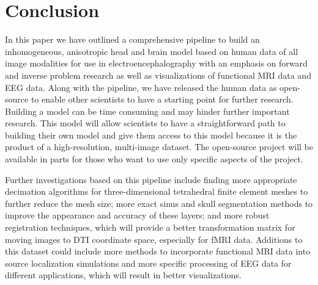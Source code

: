 %
%

\section{Conclusion}
\label{sec:Conclusion}

In this paper we have outlined a comprehensive pipeline to build an inhomogeneous, anisotropic head and brain model based on human data of all image modalities for use in electroencephalography with an emphasis on forward and inverse problem research as well as visualizations of functional MRI data and EEG data. Along with the pipeline, we have released the human data as open-source to enable other scientists to have a starting point for further research. Building a model can be time consuming and may hinder further important research. This model will allow scientists to have a straightforward path to building their own model and give them access to this model because it is the product of a high-resolution, multi-image dataset. The open-source project will be available in parts for those who want to use only specific aspects of the project. 

Further investigations based on this pipeline include finding more appropriate decimation algorithms for three-dimensional tetrahedral finite element meshes to further reduce the mesh size; more exact sinus and skull segmentation methods to improve the appearance and accuracy of these layers; and more robust registration techniques, which will provide a better transformation matrix for moving images to DTI coordinate space, especially for fMRI data. Additions to this dataset could include more methods to incorporate functional MRI data into source localization simulations and more specific processing of EEG data for different applications, which will result in better visualizations. 